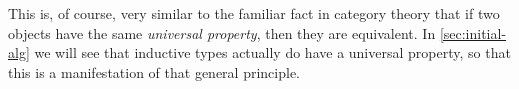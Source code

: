 This is, of course, very similar to the familiar fact in category theory that if two objects have the same \emph{universal property}, then they are equivalent.
In \autoref{sec:initial-alg} we will see that inductive types actually do have a universal property, so that this is a manifestation of that general principle.


%
%
%
%
%
